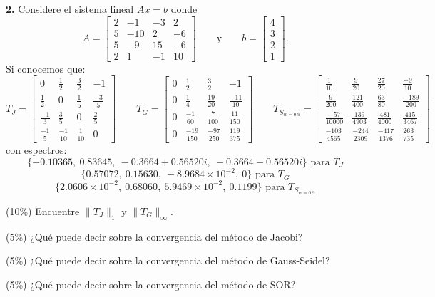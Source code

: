 \documentclass[11pt]{article}
\begin{document}
\vspace{5mm}
\noindent\textbf{2.} Considere el sistema lineal $Ax=b$ donde
\[
A=\begin{bmatrix} 2&-1&-3&2\\5&-10&2&-6\\5&-9&15&-6\\2&1&-1&10 \end{bmatrix}
\qquad\text{y}\qquad
b=\begin{bmatrix}4\\3\\2\\1\end{bmatrix}.
\]
Si conocemos que:
\[
T_J=\begin{bmatrix}
0 & \frac12 & \frac32 & -1\\
\frac12 & 0 & \frac15 & \frac{-3}5\\
\frac{-1}3 & \frac35 & 0 & \frac25\\
\frac{-1}5 & \frac{-1}{10} & \frac1{10} & 0
\end{bmatrix}
\qquad
T_G=\begin{bmatrix}
0 & \frac12 & \frac32 & -1\\
0 & \frac14 & \frac{19}{20} & \frac{-11}{10}\\
0 & \frac{-1}{60} & \frac7{100} & \frac{11}{150}\\
0 & \frac{-19}{150} & \frac{-97}{250} & \frac{119}{375}
\end{bmatrix}
\qquad
T_{S_{w=0.9}}=\begin{bmatrix}
\frac1{10} & \frac9{20} & \frac{27}{20} & \frac{-9}{10}\\
\frac9{200} & \frac{121}{400} & \frac{63}{80} & \frac{-189}{200}\\
\frac{-57}{10000} & \frac{139}{4903} & \frac{481}{4000} & \frac{415}{3467}\\
\frac{-103}{4565} & \frac{-244}{2309} & \frac{-417}{1376} & \frac{263}{735}
\end{bmatrix}
\]
con espectros:
\[
\{-0.10365,\ 0.83645,\ -0.3664+0.56520i,\ -0.3664-0.56520i\} \text{ para } T_J
\]
\[
\{0.57072,\ 0.15630,\ -8.9684\times10^{-2},\ 0\} \text{ para } T_G
\]
\[
\{2.0606\times10^{-2},\ 0.68060,\ 5.9469\times10^{-2},\ 0.1199\} \text{ para } T_{S_{w=0.9}}
\]
\begin{opciones}
\item (10\%) Encuentre $\|T_J\|_1$ y $\|T_G\|_\infty$.
\item (5\%) ¿Qué puede decir sobre la convergencia del método de Jacobi?
\item (5\%) ¿Qué puede decir sobre la convergencia del método de Gauss-Seidel?
\item (5\%) ¿Qué puede decir sobre la convergencia del método de SOR?
\end{opciones}
\end{document}
